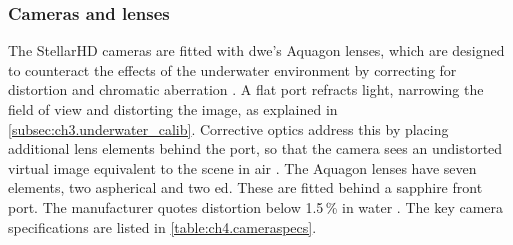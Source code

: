 \subsubsection{Cameras and lenses}
\label{subsec:ch4.cameras}
The StellarHD cameras are fitted with \gls{dwe}'s Aquagon lenses, which are designed to counteract the effects of the underwater environment
by correcting for distortion and chromatic aberration \cite{dweAquagon}.
A flat port refracts light, narrowing the field of view and distorting the image, as explained in \autoref{subsec:ch3.underwater_calib}. Corrective optics address this by placing additional lens elements behind the port, so that the camera sees an undistorted
virtual image equivalent to the scene in air \cite{slaterAfocalViewportOptics2014}.
The Aquagon lenses have seven elements, two aspherical and two \gls{ed}.
These are fitted behind a sapphire front port. The manufacturer quotes distortion below 1.5\,\% in water \cite{dweStellarHDDatasheet}.
The key camera specifications are listed in \autoref{table:ch4.cameraspecs}.
